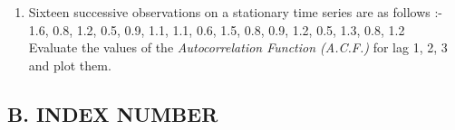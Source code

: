\documentclass[11pt, a4paper]{article}
\begin{document}
\begin{enumerate}
	
	
	
	
	
	
	
	
	
	
	
	
	
	
	
	
	
	
	
	
	\item Sixteen successive observations on a stationary time series are as follows :- \\
	
	1.6, 0.8, 1.2, 0.5, 0.9, 1.1, 1.1, 0.6, 1.5, 0.8, 0.9, 1.2, 0.5, 1.3, 0.8, 1.2 \\
	
	Evaluate the values of the \textit{Autocorrelation Function (A.C.F.)} for lag 1, 2, 3 and plot them.
	
	
	
\end{enumerate}




\pagebreak








\begin{center}

\section*{B. INDEX NUMBER}

\end{center}



\vspace{1cm}
\end{document}
